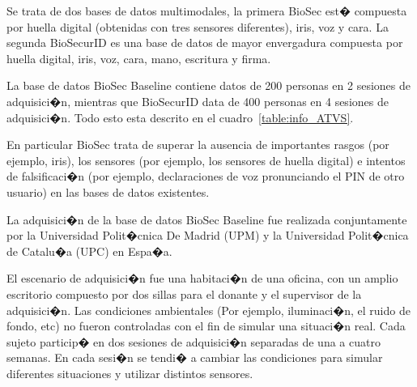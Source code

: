  \label{sec:ATVS_database}

Se trata de dos bases de datos multimodales, la primera BioSec est� compuesta por huella digital (obtenidas con tres sensores diferentes), iris, voz y cara. La segunda BioSecurID es una base de datos de mayor envergadura compuesta por huella digital, iris, voz, cara, mano, escritura y firma.

La base de datos BioSec Baseline contiene datos de 200 personas en 2 sesiones de adquisici�n, mientras que BioSecurID data de 400 personas en 4 sesiones de adquisici�n. Todo esto esta descrito en el cuadro~\ref{table:info_ATVS}.

En particular BioSec trata de superar la ausencia de importantes rasgos (por ejemplo, iris), los sensores (por ejemplo, los sensores de huella digital) e intentos de falsificaci�n (por ejemplo, declaraciones de voz pronunciando el PIN de otro usuario) en las bases de datos existentes.

La adquisici�n de la base de datos BioSec Baseline fue realizada conjuntamente por la Universidad Polit�cnica De Madrid (UPM) y la Universidad Polit�cnica de Catalu�a (UPC) en Espa�a.

El escenario de adquisici�n fue una habitaci�n de una oficina, con un amplio escritorio compuesto por dos sillas para el donante y el supervisor de la adquisici�n. Las condiciones ambientales (Por ejemplo, iluminaci�n, el ruido de fondo, etc) no fueron controladas con el fin de simular una situaci�n real. Cada sujeto particip� en dos sesiones de adquisici�n separadas de una a cuatro semanas. En cada sesi�n se tendi� a cambiar las condiciones para simular diferentes situaciones y utilizar distintos sensores.
%
%
%
%

